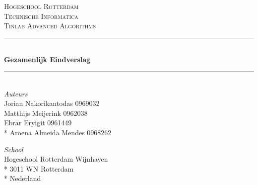 \documentclass[oneside]{scrbook}
\date{\today}
\begin{document}

\begin{titlepage} %
	\newcommand{\HRule}{\rule{\linewidth}{0.5mm}} %
	
	\center %
	
	
	\textsc{\LARGE Hogeschool Rotterdam}\\[1.5cm] %
	
	\textsc{\Large Technische Informatica}\\[0.5cm] %
	
	\textsc{\large Tinlab Advanced Algorithms}\\[0.5cm] %
	
	
	\HRule\\[0.4cm]
	
	{\huge\bfseries Gezamenlijk Eindverslag}\\[0.4cm] %
	
	\HRule\\[1.5cm]
	
	
	{\large\textit{Auteurs}}\\
	Jorian Nakorikantodas 0969032  \\
	Matthijs Meijerink 0962038 \\
	Ebrar Eryigit 0961449 \\*
	Aroena Almeida Mendes 0968262 
        
        
	
	{\large\textit{School}}\\
    Hogeschool Rotterdam Wijnhaven  \\*
    3011 WN Rotterdam \\*
    Nederland
    

\end{titlepage}
\end{document}
